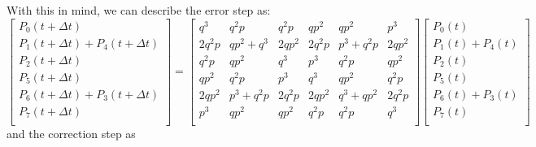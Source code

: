 \documentclass{report}
\begin{document}
With this in mind, we can describe the error step as:
\begin{equation} \label{eq:Ematrix}
    \begin{bmatrix}
        P_0(t+\Delta t) \\
        P_1(t+\Delta t) + P_4(t+\Delta t) \\
        P_2(t+\Delta t) \\
        P_5(t+\Delta t) \\
        P_6(t+\Delta t)  + P_3(t + \Delta t)\\
        P_7(t+\Delta t) \\
    \end{bmatrix}
    =
    \begin{bmatrix}
        q^3& q^2p& q^2p& qp^2& qp^2& p^3 \\
        2 q^2p& qp^2 + q^3& 2 qp^2& 2 q^2p& p^3 + q^2p& 2 qp^2\\
        q^2p& qp^2& q^3& p^3& q^2p& qp^2\\
        qp^2& q^2p& p^3& q^3& qp^2& q^2p\\
        2 qp^2& p^3 + q^2p& 2 q^2p& 2 qp^2& q^3 + qp^2& 2 q^2p\\
        p^3& qp^2& qp^2& q^2p& q^2p& q^3\\

    \end{bmatrix}
    \begin{bmatrix}
        P_0(t) \\
        P_1(t) + P_4(t) \\
        P_2(t) \\
        P_5(t) \\
        P_6(t)  + P_3(t)\\
        P_7(t) \\
    \end{bmatrix}
\end{equation}
and the correction step as
\end{document}
